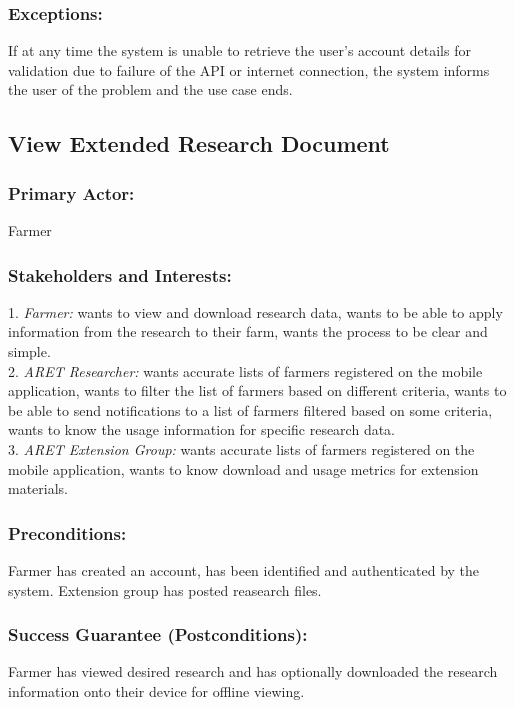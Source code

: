 \documentclass[12pt,letterpaper]{article}
\begin{document}
\subsubsection*{Exceptions:}
If at any time the system is unable to retrieve the user’s account details for validation due to failure of the API or internet connection, the system informs the user of the problem and the use case ends.

\clearpage
\subsection{View Extended Research Document}
\subsubsection*{Primary Actor:} Farmer
\subsubsection*{Stakeholders and Interests:}
1. \emph{Farmer:} wants to view and download research data, wants to be able to apply information from the research to their farm, wants the process to be clear and simple. \\[10pt]
2. \emph{ARET Researcher:} wants accurate lists of farmers registered on the mobile application, wants to filter the list of farmers based on different criteria, wants to be able to send notifications to a list of farmers filtered based on some criteria, wants to know the usage information for specific research data.\\[10pt]
3. \emph{ARET Extension Group:} wants accurate lists of farmers registered on the mobile application, wants to know download and usage metrics for extension materials.

\subsubsection*{Preconditions:}
Farmer has created an account, has been identified and authenticated by the system. Extension group has posted reasearch files.

\subsubsection*{Success Guarantee (Postconditions):}
Farmer has viewed desired research and has optionally downloaded the research information onto their device for offline viewing. 
\end{document}
